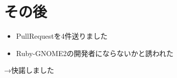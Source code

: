 \section{その後}

\begin{itemize}
\item PullRequestを4件送りました
\item Ruby-GNOME2の開発者にならないかと誘われた
\end{itemize}

→快諾しました